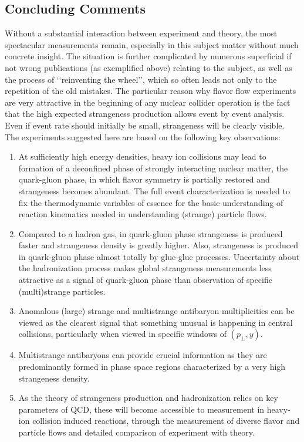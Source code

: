 \begin{mdframed}[linecolor=gray,roundcorner=12pt,backgroundcolor=Dandelion!15,linewidth=1pt,leftmargin=0cm,rightmargin=0cm,topline=true,bottomline=true,skipabove=12pt]
\section*{Concluding Comments}

Without a substantial interaction between experiment and theory, the most spectacular measurements remain, especially in this subject matter without much concrete insight. The situation is further complicated by numerous superficial if not wrong publications (as exemplified above) relating to the subject, as well as the process of \lq\lq reinventing the wheel\rq\rq, which so often leads not only to the repetition of the old mistakes. The particular reason why flavor flow experiments are very attractive in the beginning of any nuclear collider operation is the fact that the high expected strangeness production allows event by event analysis. Even if event rate should initially be small, strangeness will be clearly visible. The experiments suggested here are based on the following key observations:
\begin{enumerate}
%
\item At sufficiently high energy densities, heavy ion collisions may lead to formation of a deconfined phase of strongly interacting nuclear matter, the quark-gluon phase, in which flavor symmetry is partially restored and strangeness becomes abundant. The full event characterization is needed to fix the thermodynamic variables of essence for the basic understanding of reaction kinematics needed in understanding (strange) particle flows.
%
\item Compared to a hadron gas, in quark-gluon phase strangeness is produced faster and strangeness density is greatly higher. Also, strangeness is produced in quark-gluon phase almost totally by glue-glue processes. Uncertainty about the hadronization process makes global strangeness measurements less attractive as a signal of quark-gluon phase than observation of specific (multi)strange particles.
%
\item Anomalous (large) strange and multistrange antibaryon multiplicities can be viewed as the clearest signal that something unusual is happening in central collisions, particularly when viewed in specific windows of $(p_\perp,y)$. 
%
\item Multistrange antibaryons can provide crucial information as they are predominantly formed in phase space regions characterized by a very high strangeness density. 
%
\item As the theory of strangeness production and hadronization relies on key parameters of QCD, these will become accessible to measurement in heavy-ion collision induced reactions, through the measurement of diverse flavor and particle flows and detailed comparison of experiment with theory.

\end{enumerate}
\end{mdframed}

